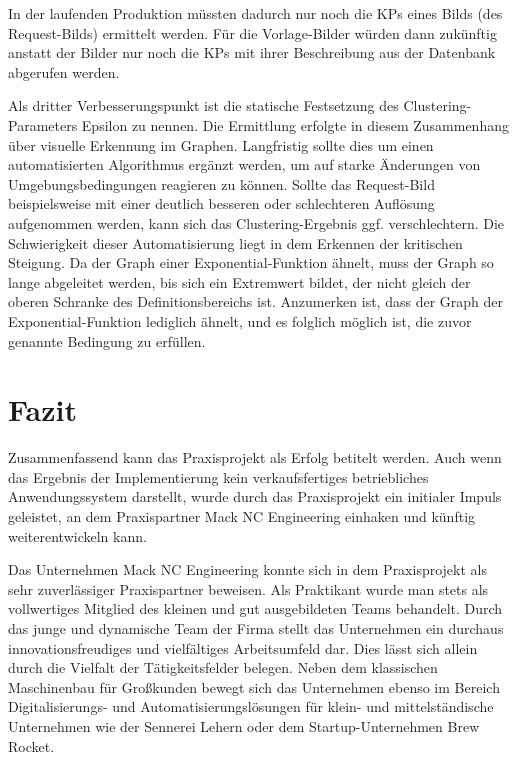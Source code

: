\documentclass[
    type=Prakikumsbericht,
    status=draft, %
    language=german, %
    bibengine=bibtex,
]{unibwm-inf-thesis}
\begin{document}
    In der laufenden Produktion müssten dadurch nur noch die \acp{KP} eines Bilds (des Request-Bilds) ermittelt werden.
    Für die Vorlage-Bilder würden dann zukünftig anstatt der Bilder nur noch die \acp{KP} mit ihrer Beschreibung aus der Datenbank abgerufen werden.

    Als dritter Verbesserungspunkt ist die statische Festsetzung des Clustering-Parameters Epsilon zu nennen.
    Die Ermittlung erfolgte in diesem Zusammenhang über visuelle Erkennung im Graphen.
    Langfristig sollte dies um einen automatisierten Algorithmus ergänzt werden, um auf starke Änderungen von Umgebungsbedingungen reagieren zu können.
    Sollte das Request-Bild beispielsweise mit einer deutlich besseren oder schlechteren Auflösung aufgenommen werden, kann sich das Clustering-Ergebnis ggf. verschlechtern.
    Die Schwierigkeit dieser Automatisierung liegt in dem Erkennen der kritischen Steigung.
    Da der Graph einer Exponential-Funktion ähnelt, muss der Graph so lange abgeleitet werden, bis sich ein Extremwert bildet, der nicht gleich der oberen Schranke des Definitionsbereichs ist.
    Anzumerken ist, dass der Graph der Exponential-Funktion lediglich ähnelt, und es folglich möglich ist, die zuvor genannte Bedingung zu erfüllen.

   \chapter{Fazit}
    Zusammenfassend kann das Praxisprojekt als Erfolg betitelt werden.
    Auch wenn das Ergebnis der Implementierung kein verkaufsfertiges betriebliches Anwendungssystem darstellt, wurde durch das Praxisprojekt ein
    initialer Impuls geleistet, an dem Praxispartner Mack NC Engineering einhaken und künftig weiterentwickeln kann.

    Das Unternehmen Mack NC Engineering konnte sich in dem Praxisprojekt als sehr zuverlässiger Praxispartner beweisen.
    Als Praktikant wurde man stets als vollwertiges Mitglied des kleinen und gut ausgebildeten Teams behandelt.
    Durch das junge und dynamische Team der Firma stellt das Unternehmen ein durchaus innovationsfreudiges und vielfältiges Arbeitsumfeld dar.
    Dies lässt sich allein durch die Vielfalt der Tätigkeitsfelder belegen.
    Neben dem klassischen Maschinenbau für Großkunden bewegt sich das Unternehmen ebenso im Bereich Digitalisierungs- und Automatisierungslösungen für klein- und mittelständische
    Unternehmen wie der Sennerei Lehern oder dem Startup-Unternehmen Brew Rocket.
\end{document}
